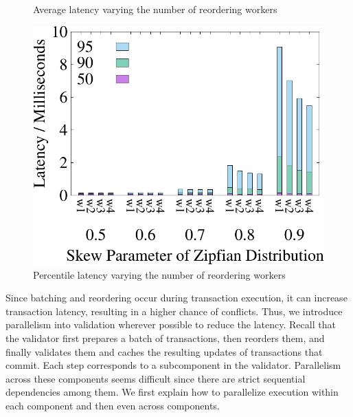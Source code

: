 \begin{figure}[!htbp]
\begin{minipage}[b]{0.31\linewidth}
		\caption{Average latency varying the number of reordering workers}
		\label{fig:reorder:latency}
	\end{minipage}    
	\begin{minipage}[b]{0.31\linewidth}
		\centering
		\includegraphics[width=\textwidth]{./exp_fig/reorder/percent95_latency}
		\caption{Percentile latency varying the number of reordering workers}
		\label{fig:reorder:p95}
	\end{minipage}    
\end{figure}


Since batching and reordering occur during transaction execution, it can increase transaction latency, 
resulting in a higher chance of conflicts. Thus, we introduce parallelism into validation wherever possible to reduce the latency.
Recall that the validator first prepares a batch of transactions, then reorders them,  
and finally validates them and caches the resulting updates of transactions that commit.
 Each step corresponds to a subcomponent in the validator. Parallelism across these components seems difficult since there are strict sequential dependencies among them. We first explain how to parallelize execution within each component and then even across components.


